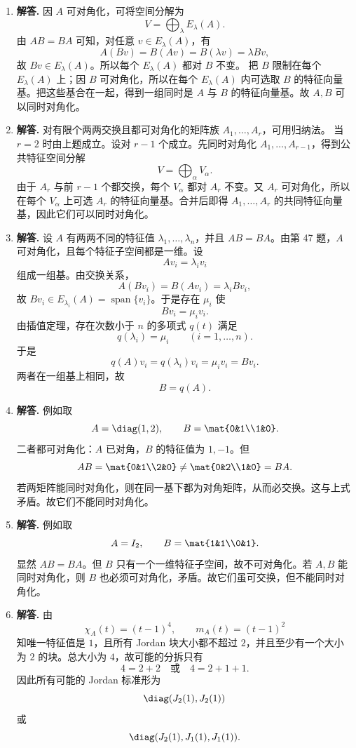\begin{enumerate}[label=\textbf{\arabic*.}, leftmargin=*, itemsep=1em]
\item \textbf{解答.} 因 \(A\) 可对角化，可将空间分解为
\[
V=\bigoplus_\lambda E_\lambda(A).
\]
由 \(AB=BA\) 可知，对任意 \(v\in E_\lambda(A)\)，有
\[
A(Bv)=B(Av)=B(\lambda v)=\lambda Bv,
\]
故 \(Bv\in E_\lambda(A)\)。所以每个 \(E_\lambda(A)\) 都对 \(B\) 不变。  
把 \(B\) 限制在每个 \(E_\lambda(A)\) 上；因 \(B\) 可对角化，所以在每个 \(E_\lambda(A)\) 内可选取 \(B\) 的特征向量基。把这些基合在一起，得到一组同时是 \(A\) 与 \(B\) 的特征向量基。故 \(A,B\) 可以同时对角化。

\item \textbf{解答.} 对有限个两两交换且都可对角化的矩阵族 \(A_1,\dots,A_r\)，可用归纳法。  
当 \(r=2\) 时由上题成立。设对 \(r-1\) 个成立。先同时对角化 \(A_1,\dots,A_{r-1}\)，得到公共特征空间分解
\[
V=\bigoplus_\alpha V_\alpha.
\]
由于 \(A_r\) 与前 \(r-1\) 个都交换，每个 \(V_\alpha\) 都对 \(A_r\) 不变。又 \(A_r\) 可对角化，所以在每个 \(V_\alpha\) 上可选 \(A_r\) 的特征向量基。合并后即得 \(A_1,\dots,A_r\) 的共同特征向量基，因此它们可以同时对角化。

\item \textbf{解答.} 设 \(A\) 有两两不同的特征值 \(\lambda_1,\dots,\lambda_n\)，并且 \(AB=BA\)。由第 47 题，\(A\) 可对角化，且每个特征子空间都是一维。设
\[
Av_i=\lambda_i v_i
\]
组成一组基。由交换关系，
\[
A(Bv_i)=B(Av_i)=\lambda_i Bv_i,
\]
故 \(Bv_i\in E_{\lambda_i}(A)=\operatorname{span}\{v_i\}\)。于是存在 \(\mu_i\) 使
\[
Bv_i=\mu_i v_i.
\]
由插值定理，存在次数小于 \(n\) 的多项式 \(q(t)\) 满足
\[
q(\lambda_i)=\mu_i\qquad (i=1,\dots,n).
\]
于是
\[
q(A)v_i=q(\lambda_i)v_i=\mu_i v_i=Bv_i.
\]
两者在一组基上相同，故
\[
B=q(A).
\]

\item \textbf{解答.} 例如取
\[
A=\diag(1,2),\qquad B=\mat{0&1\\1&0}.
\]
二者都可对角化：\(A\) 已对角，\(B\) 的特征值为 \(1,-1\)。但
\[
AB=\mat{0&1\\2&0}\neq \mat{0&2\\1&0}=BA.
\]
若两矩阵能同时对角化，则在同一基下都为对角矩阵，从而必交换。这与上式矛盾。故它们不能同时对角化。

\item \textbf{解答.} 例如取
\[
A=I_2,\qquad B=\mat{1&1\\0&1}.
\]
显然 \(AB=BA\)。但 \(B\) 只有一个一维特征子空间，故不可对角化。若 \(A,B\) 能同时对角化，则 \(B\) 也必须可对角化，矛盾。故它们虽可交换，但不能同时对角化。

\item \textbf{解答.} 由
\[
\chi_A(t)=(t-1)^4,\qquad m_A(t)=(t-1)^2
\]
知唯一特征值是 \(1\)，且所有 Jordan 块大小都不超过 \(2\)，并且至少有一个大小为 \(2\) 的块。总大小为 \(4\)，故可能的分拆只有
\[
4=2+2\quad\text{或}\quad 4=2+1+1.
\]
因此所有可能的 Jordan 标准形为
\[
\diag(J_2(1),J_2(1))
\]
或
\[
\diag(J_2(1),J_1(1),J_1(1)).
\]


\end{enumerate}
